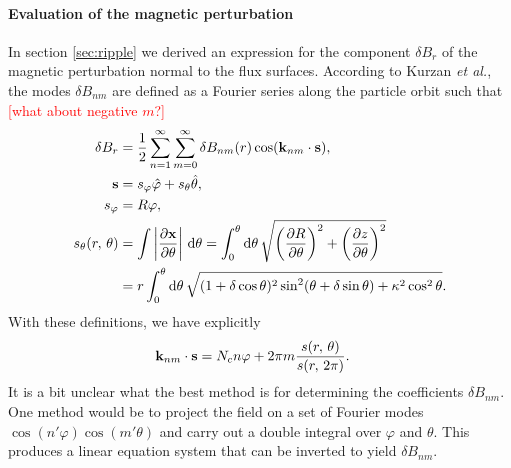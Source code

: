\documentclass[11pt,a4paper]{article}
\newcommand{\rd}{\ensuremath{\mathrm{d}}}
\renewcommand{\b}[1]{\ensuremath{ {\bf #1 } }}
\begin{document}
\paragraph{Evaluation of the magnetic perturbation}
In section \ref{sec:ripple} we derived an expression for the component $\delta B_r$ of the magnetic perturbation normal to the flux surfaces. According to Kurzan \emph{et al.}, the modes $\delta B_{nm}$ are defined as a Fourier series along the particle orbit such that \textcolor{red}{[what about negative $m$?]}
\begin{align}
\delta B_r &= \frac{1}{2}\sum_{n=1}^\infty \sum_{m=0}^\infty \delta B_{nm}(r) \cos(\b{k}_{nm}\cdot \b{s}), \nonumber \\
\b{s} &= s_\varphi \hat{\varphi} + s_\theta \hat{\theta}, \nonumber \\
s_\varphi &= R\varphi , \nonumber \\
s_\theta(r,\,\theta) &= \int \left| \frac{\partial \b{x}}{\partial \theta}\right| \,\rd \theta 
=  \int_0^\theta \rd\theta  \,  \sqrt{\left(\frac{\partial R}{\partial \theta} \right)^2 + \left( \frac{\partial z}{\partial \theta}\right)^2} \nonumber \\
&= r \int_0^\theta \rd \theta \, \sqrt{ (1+\delta\cos\theta)^2\sin^2(\theta+\delta\sin\theta) +  \kappa^2\cos^2\theta}.
\end{align}
With these definitions, we have explicitly
\begin{align}
\b{k}_{nm}\cdot \b{s} &= N_c n \varphi + 2\pi m \frac{s(r,\,\theta)}{s(r,\,	2\pi)}.
\end{align}
It is a bit unclear what the best method is for determining the coefficients $\delta B_{nm}$. One method would be to project the field on a set of Fourier modes $\cos( n' \varphi) \cos(m'\theta)$ and carry out a double integral over $\varphi$ and $\theta$. This produces a linear equation system that can be inverted to yield $\delta B_{nm}$. 
\end{document}
